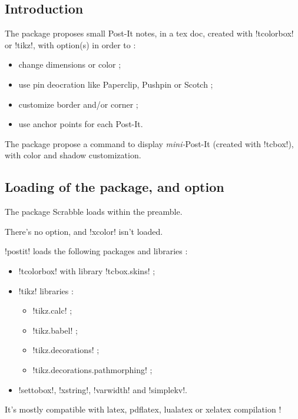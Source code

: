 \documentclass[english,a4paper,11pt]{article}
\begin{document}
\subsection{Introduction}

\begin{noteblock}
The package proposes small Post-It notes, in a \textsf{tex} doc, created with \packagetex!tcolorbox! or \packagetex!tikz!, with option(s) in order to :

\begin{itemize}
	\item change dimensions or color ;
	\item use pin deocration like Paperclip, Pushpin or Scotch ;
	\item customize border and/or corner ;
	\item use anchor points for each Post-It.
\end{itemize}

The package propose a command to display \textit{mini-}Post-It (created with \motcletex!tcbox!), with color and shadow customization.
\end{noteblock}

\subsection{Loading of the package, and option}

\begin{importantblock}
The package Scrabble loads within the preamble.

There's no option, and \packagetex!xcolor! isn't loaded.
\end{importantblock}


\begin{noteblock}
\packagetex!postit! loads the following packages and libraries :

\begin{itemize}
	\item \packagetex!tcolorbox! with library \packagetex!tcbox.skins! ;
	\item \packagetex!tikz! libraries :
	\begin{itemize}
		\item \packagetex!tikz.calc! ;
		\item \packagetex!tikz.babel! ;
		\item \packagetex!tikz.decorations! ;
		\item \packagetex!tikz.decorations.pathmorphing! ;
	\end{itemize}
	\item \packagetex!settobox!, \packagetex!xstring!, \packagetex!varwidth! and \packagetex!simplekv!.
\end{itemize}

It’s mostly compatible with \textsf{latex}, \textsf{pdflatex}, \textsf{lualatex} or \textsf{xelatex} compilation !
\end{noteblock}
\end{document}
